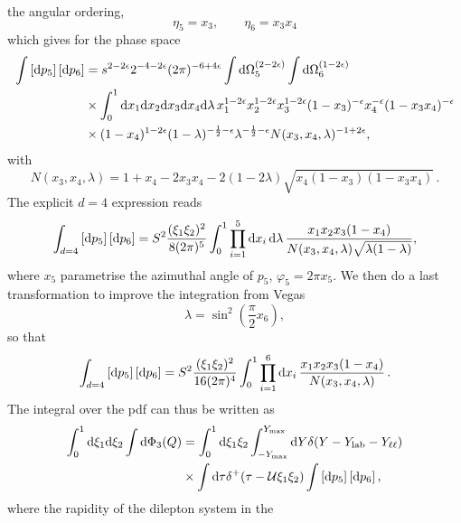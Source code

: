\documentclass[a4paper,11pt]{article}
\begin{document}
the angular ordering, \ie
\begin{equation}
\eta_5 = x_3, \quad\quad
\eta_6 = x_3 x_4
\end{equation}
which gives for the phase space
\begin{align}
\int \left[ \mathrm d p_5\right] \left[ \mathrm d p_6\right] &= 
s^{2-2\epsilon} 2^{-4-2\epsilon} (2\pi)^{-6+4\epsilon}
\int\mathrm d \Omega^{(2-2\epsilon)}_5
\int\mathrm d \Omega^{(1-2\epsilon)}_6 \nonumber \\
&\times
\int^1_0\mathrm d x_1 \mathrm d x_2 \mathrm d x_3 \mathrm d x_4\mathrm d\lambda\,
x_1^{1-2\epsilon} x_2^{1-2\epsilon}
x_3^{1-2\epsilon} (1-x_3)^{-\epsilon}
x_4^{-\epsilon}(1-x_3 x_4)^{-\epsilon} \nonumber \\
&\times
(1-x_4)^{1-2\epsilon}
(1-\lambda)^{-\frac{1}{2}-\epsilon}\lambda^{-\frac{1}{2}-\epsilon}
N(x_3,x_4,\lambda)^{-1+2\epsilon},
\end{align}
with
\begin{equation}
N(x_3,x_4,\lambda) = 
1 + x_4 - 2 x_3 x_4 - 2(1-2\lambda)\sqrt{x_4(1-x_3)(1-x_3 x_4)}\,.
\end{equation}
The explicit $d=4$ expression reads
\begin{equation}
\int_{d=4} \left[ \mathrm d p_5\right] \left[ \mathrm d p_6\right] = 
S^2\frac{(\xi_1 \xi_2)^2}{8(2\pi)^5}
\int^1_0\prod_{i=1}^5 \mathrm d x_i\,\mathrm d\lambda\,
\frac{x_1 x_2 x_3 (1-x_4)}{N(x_3,x_4,\lambda)\sqrt{\lambda(1-\lambda)}},
\end{equation}
where $x_5$ parametrise the azimuthal angle of $p_5$, \ie
$\varphi_5 = 2\pi x_5$.
We then do a last transformation to improve the integration from Vegas
\begin{equation}
\lambda = \sin^2\left(\frac{\pi}{2} x_6\right),
\end{equation}
so that
\begin{equation}
\int_{d=4} \left[ \mathrm d p_5\right] \left[ \mathrm d p_6\right] = 
S^2\frac{(\xi_1 \xi_2)^2}{16(2\pi)^4}
\int^1_0\prod_{i=1}^6 \mathrm d x_i\,
\frac{x_1 x_2 x_3 (1-x_4)}{N(x_3,x_4,\lambda)}\,.
\end{equation}
The integral over the pdf can thus be written as
\begin{align}
\label{eq:nnloispdfintegral}
\int^1_0 \mathrm d \xi_1 \mathrm d \xi_2 \int \mathrm d \Phi_3 (Q) &= 
\int^1_0 \mathrm d \xi_1 \xi_2 \int^{Y_{\max}}_{-Y_{\max}} 
\mathrm d Y \delta(Y-Y_{\mathrm{lab}}-Y_{\ell\ell}) \nonumber \\
&\times \int \mathrm d\tau
\delta^+(\tau - \mathcal{U} \xi_1 \xi_2)
\int \left[ \mathrm d p_5\right] \left[ \mathrm d p_6\right],
\end{align}
where the rapidity of the dilepton system in the 
\end{document}
